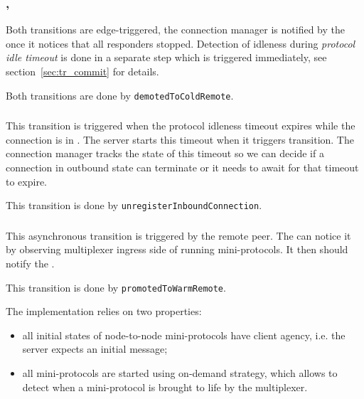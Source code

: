 \subsubsection{\DemotedToColdUniRem{}, \DemotedToColdDupRem{}}
Both transitions are edge-triggered, the connection manager is notified by the
\inbgov{} once it notices that all responders stopped. Detection of idleness
during \textit{protocol idle timeout} is done in a separate step which is
triggered immediately, see section~\ref{sec:tr_commit} for details.

\begin{detail}
  Both transitions are done by \texttt{demotedToColdRemote}.
\end{detail}

\subsubsection{\TimeoutExpired{}}
This transition is triggered when the protocol idleness timeout expires while
the connection is in \OutboundStateDupTau{}. The server starts this timeout
when it triggers \DemotedToColdAnyRem{} transition. The connection manager
tracks the state of this timeout so we can decide if a connection in outbound
state can terminate or it needs to await for that timeout to expire.

\begin{detail}
  This transition is done by \texttt{unregisterInboundConnection}.
\end{detail}

\subsubsection{\PromotedToWarmDupRem{}}
This asynchronous transition is triggered by the remote peer.  The \inbgov{}
can notice it by observing multiplexer ingress side of running mini-protocols.
It then should notify the \connmngr{}.

\begin{detail}
  This transition is done by \texttt{promotedToWarmRemote}.

  The implementation relies on two properties:
  \begin{itemize}
    \item all initial states of node-to-node mini-protocols have client agency, i.e. the
      server expects an initial message;
    \item all mini-protocols are started using on-demand strategy, which allows
      to detect when a mini-protocol is brought to life by the multiplexer.
  \end{itemize}
\end{detail}


